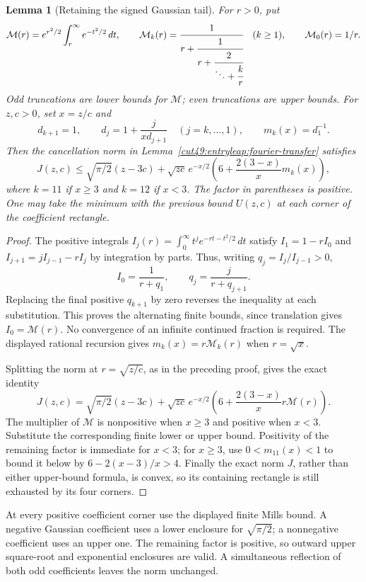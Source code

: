 \documentclass[11pt,a4paper]{article}
\numberwithin{equation}{section}
\newtheorem{lemma}[theorem]{Lemma}
\theoremstyle{definition}
\theoremstyle{remark}
\begin{document}
\begin{lemma}[Retaining the signed Gaussian tail]\label{cut49:entry189:mills}
For $r>0$, put
\[
 \mathcal M(r)=e^{r^2/2}\int_r^\infty e^{-t^2/2}\,dt,
 \qquad
 \mathcal M_k(r)=\cfrac1{r+\cfrac1{r+\cfrac2{\ddots+\cfrac{k}{r}}}}
 \quad(k\ge1),\qquad \mathcal M_0(r)=1/r.
\]
Odd truncations are lower bounds for $\mathcal M$; even truncations
are upper bounds. For $z,c>0$, set $x=z/c$ and
\[
 d_{k+1}=1,\qquad d_j=1+\frac j{xd_{j+1}}\quad(j=k,\ldots,1),
 \qquad m_k(x)=d_1^{-1}.
\]
Then the cancellation norm in Lemma~\ref{cut49:entryleap:fourier-transfer}
satisfies
\begin{equation}\label{cut49:entry189:mills-bound}
 J(z,c)\le \sqrt{\pi/2}(z-3c)+\sqrt{zc}\,e^{-x/2}
 \left(6+\frac{2(3-x)}x m_k(x)\right),
\end{equation}
where $k=11$ if $x\ge3$ and $k=12$ if $x<3$.
The factor in parentheses is positive. One may take the minimum with
the previous bound $U(z,c)$ at each corner of the coefficient rectangle.
\end{lemma}
\begin{proof}
The positive integrals
$I_j(r)=\int_0^\infty t^j e^{-rt-t^2/2}\,dt$ satisfy
$I_1=1-rI_0$ and $I_{j+1}=jI_{j-1}-rI_j$ by integration by parts.
Thus, writing $q_j=I_j/I_{j-1}>0$,
\[
 I_0=\frac1{r+q_1},\qquad q_j=\frac j{r+q_{j+1}}.
\]
Replacing the final positive $q_{k+1}$ by zero reverses the inequality
at each substitution. This proves the alternating finite bounds, since
translation gives $I_0=\mathcal M(r)$. No convergence of an infinite
continued fraction is required. The displayed rational recursion gives
$m_k(x)=r\mathcal M_k(r)$ when $r=\sqrt x$.

Splitting the norm at $r=\sqrt{z/c}$, as in the preceding proof, gives
the exact identity
\[
 J(z,c)=\sqrt{\pi/2}(z-3c)+\sqrt{zc}\,e^{-x/2}
 \left(6+\frac{2(3-x)}x r\mathcal M(r)\right).
\]
The multiplier of $\mathcal M$ is nonpositive when $x\ge3$ and
positive when $x<3$. Substitute the corresponding finite lower or
upper bound. Positivity of the remaining factor is immediate for
$x<3$; for $x\ge3$, use $0<m_{11}(x)<1$ to bound it below by
$6-2(x-3)/x>4$. Finally the exact norm $J$, rather than either
upper-bound formula, is convex, so its containing rectangle is still
exhausted by its four corners.
\end{proof}

At every positive coefficient corner use the displayed finite Mills bound.
A negative Gaussian coefficient uses a lower enclosure for
$\sqrt{\pi/2}$; a nonnegative coefficient uses an upper one. The remaining
factor is positive, so outward upper square-root and exponential enclosures
are valid. A simultaneous reflection of both odd coefficients leaves the
norm unchanged.
\end{document}
